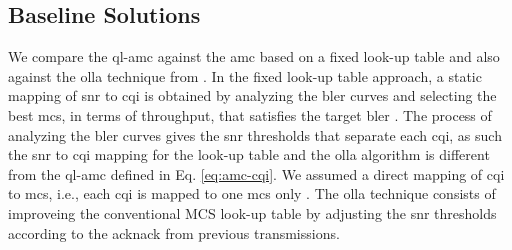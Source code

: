 \subsection{Baseline Solutions}

%
We compare the \gls{ql-amc} against the \gls{amc} based on a fixed look-up table \cite{fantacci2009adaptive} and also against the \gls{olla} technique from \cite{Pedersen2007}.
%
In the fixed look-up table approach, a static mapping of \gls{snr} to \gls{cqi} is obtained by analyzing the \gls{bler} curves and selecting the best \gls{mcs}, in terms of throughput, that satisfies the target \gls{bler} \cite{bruno2014robust}.
%
The process of analyzing the \gls{bler} curves gives the \gls{snr} thresholds that separate each \gls{cqi}, as such the \gls{snr} to \gls{cqi} mapping for the look-up table and the \gls{olla} algorithm is different from the \gls{ql-amc} defined in Eq. \eqref{eq:amc-cqi}.
%
We assumed a direct mapping of \gls{cqi} to \gls{mcs}, i.e., each \gls{cqi} is mapped to one \gls{mcs} only .
The \gls{olla} technique consists of improveing the conventional MCS look-up table by adjusting the \gls{snr} thresholds according to the \gls{acknack} from previous transmissions.
